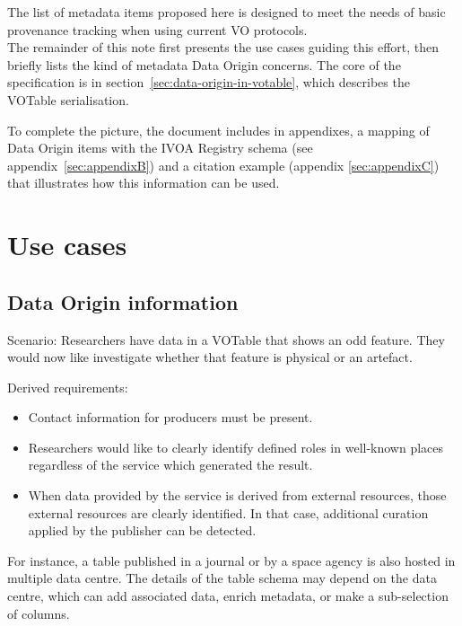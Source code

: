 \documentclass[11pt,a4paper]{ivoa}
\begin{document}
The list of metadata items proposed here is designed to meet the needs of basic provenance
tracking when using current VO protocols.\\


The remainder of this note first presents the use cases guiding this
effort, then briefly lists the kind of metadata Data Origin concerns.
The core of the specification is in
section~\ref{sec:data-origin-in-votable}, which
describes the VOTable serialisation.

To complete the picture, the document includes in appendixes, a mapping of Data Origin items with the IVOA Registry schema (see appendix~\ref{sec:appendixB})
and a citation example (appendix \ref{sec:appendixC}) that illustrates how this information can be used.



\section{Use cases}

\subsection{Data Origin information}

Scenario: Researchers have data in a VOTable that shows an odd feature. They would now like investigate whether that feature is physical or an artefact.

Derived requirements:

\begin{itemize}
\item Contact information for producers must be present.

\item Researchers would like to clearly identify defined roles in well-known places regardless of the service which generated the result.

\item When data provided by the service is derived from external resources, those external resources are clearly identified.  In that case, additional curation applied by the publisher can be detected.
\end{itemize}

For instance, a table published in a journal or by a space agency is also hosted in multiple data centre. The details of the table schema may depend on the data centre, which can add associated data, enrich metadata, or make a sub-selection of columns.
\end{document}
